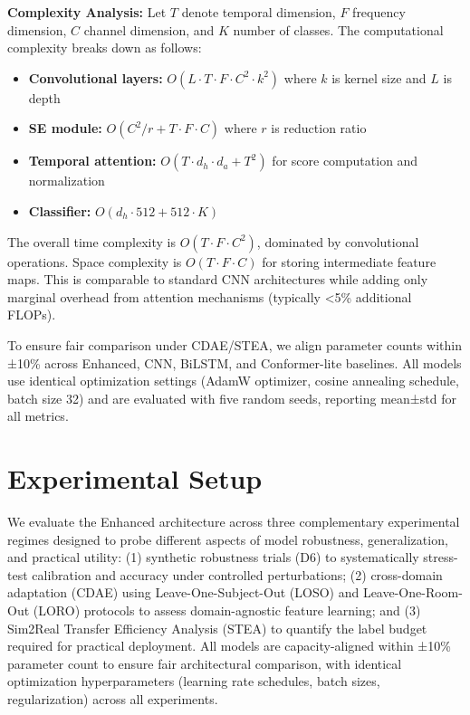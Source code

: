 \documentclass[journal]{IEEEtran}
\begin{document}
\textbf{Complexity Analysis:} Let $T$ denote temporal dimension, $F$ frequency dimension, $C$ channel dimension, and $K$ number of classes. The computational complexity breaks down as follows:
\begin{itemize}
\item \textbf{Convolutional layers:} $O(L \cdot T \cdot F \cdot C^2 \cdot k^2)$ where $k$ is kernel size and $L$ is depth
\item \textbf{SE module:} $O(C^2/r + T \cdot F \cdot C)$ where $r$ is reduction ratio
\item \textbf{Temporal attention:} $O(T \cdot d_h \cdot d_a + T^2)$ for score computation and normalization
\item \textbf{Classifier:} $O(d_h \cdot 512 + 512 \cdot K)$
\end{itemize}

The overall time complexity is $O(T \cdot F \cdot C^2)$, dominated by convolutional operations. Space complexity is $O(T \cdot F \cdot C)$ for storing intermediate feature maps. This is comparable to standard CNN architectures while adding only marginal overhead from attention mechanisms (typically <5\% additional FLOPs).

To ensure fair comparison under CDAE/STEA, we align parameter counts within ±10\% across Enhanced, CNN, BiLSTM, and Conformer-lite baselines. All models use identical optimization settings (AdamW optimizer, cosine annealing schedule, batch size 32) and are evaluated with five random seeds, reporting mean±std for all metrics.

\section{Experimental Setup}
We evaluate the Enhanced architecture across three complementary experimental regimes designed to probe different aspects of model robustness, generalization, and practical utility: (1) synthetic robustness trials (D6) to systematically stress-test calibration and accuracy under controlled perturbations; (2) cross-domain adaptation (CDAE) using Leave-One-Subject-Out (LOSO) and Leave-One-Room-Out (LORO) protocols to assess domain-agnostic feature learning; and (3) Sim2Real Transfer Efficiency Analysis (STEA) to quantify the label budget required for practical deployment. All models are capacity-aligned within ±10\% parameter count to ensure fair architectural comparison, with identical optimization hyperparameters (learning rate schedules, batch sizes, regularization) across all experiments.
\end{document}
